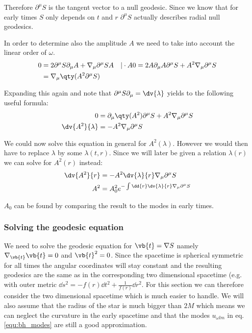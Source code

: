 Therefore \(\partial^\mu S\) is the tangent vector to a null geodesic. Since we know that for early times \(S\) only depends on \(t\) and \(r\) \(\partial^\mu S\) actually describes radial null geodesics.

In order to determine also the amplitude \(A\) we need to take into account the linear order of \(\omega\).
\begin{align}
0 &= 2 \partial^\mu S \partial_\mu A + \nabla_\mu\partial^\mu S A &| \cdot A
0 &= 2 A \partial_\mu A \partial^\mu S + A^2 \nabla_\mu\partial^\mu S\\
	&= \nabla_\mu\qty(A^2 \partial^\mu S)
\end{align}

Expanding this again and note that \(\partial^\mu S \partial_\mu = \dv{\lambda}\) yields to the following useful formula:
\begin{align}
0 &= \partial_\mu \qty(A^2) \partial^\mu S + A^2 \nabla_\mu\partial^\mu S\\
\dv{A^2}{\lambda} &= -A^2 \nabla_\mu\partial^\mu S
\end{align}

We could now solve this equation in general for \(A^2(\lambda)\). However we would then have to replace \(\lambda\) by some \(\lambda(t,r)\). Since we will later be given a relation \(\lambda(r)\) we can solve for \(A^2(r)\) instead:
\begin{align}
\dv{A^2}{r} &= -A^2 \dv{\lambda}{r} \nabla_\mu\partial^\mu S\\
A^2 &= A_0^2 e^{-\int\dd{r} \dv{\lambda}{r} \nabla_\mu\partial^\mu S}
\label{equ:hawking_amplitude}
\end{align}

\(A_0\) can be found by comparing the result to the modes in early times.

\subsubsection{Solving the geodesic equation}

We need to solve the geodesic equation for \(\vb{t} = \nabla S\) namely \(\nabla_{\vb{t}} \vb{t} = 0\) and \(\vb{t}^2 = 0\). Since the spacetime is spherical symmetric for all times the angular coordinates will stay constant and the resulting geodesics are the same as in the corresponding two dimensional spacetime (e.g. with outer metric \(\dd{s^2} = -f(r)\dd{t^2} + \frac{1}{f(r)}\dd{r^2}\). For this section we can therefore consider the two dimensional spacetime which is much easier to handle. We will also assume that the radius of the star is much bigger than \(2M\) which means we can neglect the curvature in the early spacetime and that the modes \(u_{\omega l m}\) in eq. \ref{equ:bh_modes} are still a good approximation. 

